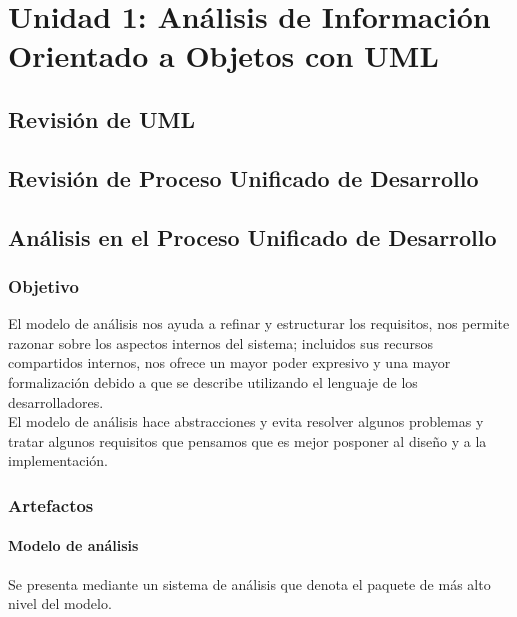 \section{Unidad 1: Análisis de Información Orientado a Objetos con UML}

\subsection{Revisión de UML}
\subsection{Revisión de Proceso Unificado de Desarrollo}
\subsection{Análisis en el Proceso Unificado de Desarrollo}
\subsubsection{Objetivo}
El modelo de análisis nos ayuda a refinar y estructurar los requisitos, nos permite razonar sobre los aspectos internos del sistema; incluidos sus recursos compartidos internos, nos ofrece un mayor poder expresivo y una mayor formalización debido a que se describe utilizando el lenguaje de los desarrolladores.\\

El modelo de análisis hace abstracciones y evita resolver algunos problemas y tratar algunos requisitos que pensamos que es mejor posponer al diseño y a la implementación.

\subsubsection{Artefactos}
\paragraph{Modelo de análisis}
Se presenta mediante un sistema de análisis que denota el paquete de más alto nivel del modelo.
